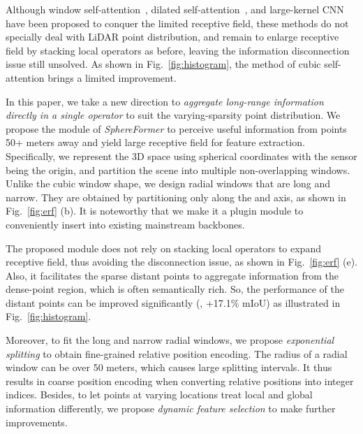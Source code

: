 \documentclass[10pt,twocolumn,letterpaper]{article}
\begin{document}
Although window self-attention~\cite{lai2022stratified,fan2022embracing}, dilated self-attention~\cite{mao2021voxel}, and large-kernel CNN~\cite{chen2022scaling} have been proposed to conquer the limited receptive field, these methods do not specially deal with LiDAR point distribution, and remain to enlarge receptive field by stacking local operators as before, leaving the information disconnection issue still unsolved. As shown in Fig.~\ref{fig:histogram}, the method of cubic self-attention brings a limited improvement.




In this paper, we take a new direction to {\it aggregate long-range information directly in a single operator} to suit the varying-sparsity point distribution. We propose the module of \textit{SphereFormer} to perceive useful information from points 50+ meters away and yield large receptive field for feature extraction. Specifically, we represent the 3D space using spherical coordinates  with the sensor being the origin, and partition the scene into multiple non-overlapping windows. Unlike the cubic window shape, we design radial windows that are long and narrow. They are obtained by partitioning only along the  and  axis, as shown in Fig.~\ref{fig:erf} (b). It is noteworthy that we make it a plugin module to conveniently insert into existing mainstream backbones. 

The proposed module does not rely on stacking local operators to expand receptive field, thus avoiding the disconnection issue, as shown in Fig.~\ref{fig:erf} (e). Also, it facilitates the sparse distant points to aggregate information from the dense-point region, which is often semantically rich. So, the performance of the distant points can be improved significantly (\ie, +17.1\% mIoU) as illustrated in Fig.~\ref{fig:histogram}. 

Moreover, to fit the long and narrow radial windows, we propose \textit{exponential splitting} to obtain fine-grained relative position encoding. The radius  of a radial window can be over 50 meters, which causes large splitting intervals. It thus results in coarse position encoding when converting relative positions into integer indices. Besides, to let points at varying locations treat local and global information differently, we propose \textit{dynamic feature selection} to make further improvements.
\end{document}
